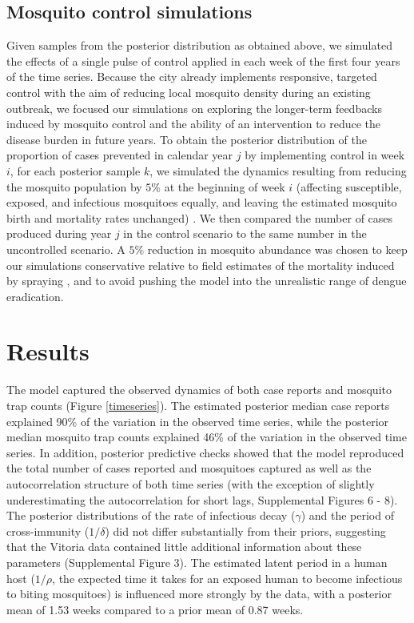 \documentclass[10pt,letterpaper]{article}
\begin{document}
\subsection*{Mosquito control simulations}

Given samples from the posterior distribution as obtained above, we simulated the effects of a single pulse of control applied in each week of the first four years of the time series.
Because the city already implements responsive, targeted control with the aim of reducing local mosquito density during an existing outbreak, we focused our simulations on exploring the longer-term feedbacks induced by mosquito control and the ability of an intervention to reduce the disease burden in future years.
To obtain the posterior distribution of the proportion of cases prevented in calendar year $j$ by implementing control in week $i$, for each posterior sample $k$, we simulated the dynamics resulting from reducing the mosquito population by $5\%$ at the beginning of week $i$ (affecting susceptible, exposed, and infectious mosquitoes equally, and leaving the estimated mosquito birth and mortality rates unchanged) .
We then compared the number of cases produced during year $j$ in the control scenario to the same number in the uncontrolled scenario.
A $5\%$ reduction in mosquito abundance was chosen to keep our simulations conservative relative to field estimates of the mortality induced by spraying \cite{Esu2010}, and to avoid pushing the model into the unrealistic range of dengue eradication.

\section*{Results}

The model captured the observed dynamics of both case reports and mosquito trap counts (Figure \ref{timeseries}).
The estimated posterior median case reports explained 90\% of the variation in the observed time series, while the posterior median mosquito trap counts explained 46\% of the variation in the observed time series. 
In addition, posterior predictive checks showed that the model reproduced the total number of cases reported and mosquitoes captured as well as the autocorrelation structure of both time series (with the exception of slightly underestimating the autocorrelation for short lags, Supplemental Figures 6 - 8).
The posterior distributions of the rate of infectious decay ($\gamma$) and the period of cross-immunity ($1/\delta$) did not differ substantially from their priors, suggesting that the Vitoria data contained little additional information about these parameters (Supplemental Figure 3).
The estimated latent period in a human host ($1/\rho$, the expected time it takes for an exposed human to become infectious to biting mosquitoes) is influenced more strongly by the data, with a posterior mean of 1.53 weeks compared to a prior mean of 0.87 weeks.
\end{document}
